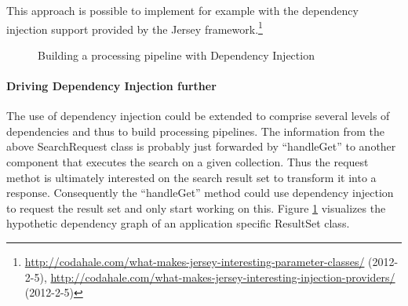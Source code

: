 \documentclass[12pt,a4paper,twoside]{scrartcl}		%
\newcommand{\citeurl}[2]{\url{#1} (#2)}
\begin{document}
This approach is possible to implement for example with the dependency injection
support provided by the Jersey
framework.\footnote{\citeurl{http://codahale.com/what-makes-jersey-interesting-parameter-classes/}{2012-2-5},
  \citeurl{http://codahale.com/what-makes-jersey-interesting-injection-providers/}{2012-2-5}}

\begin{figure}[tbph]
  \caption{Building a processing pipeline with Dependency Injection}
  \label{fig:dependency-injection-pipeline}
\end{figure}

\paragraph{Driving Dependency Injection further}

The use of dependency injection could be extended to comprise several levels of
dependencies and thus to build processing pipelines.  The information from the
above SearchRequest class is probably just forwarded by ``handleGet'' to another
component that executes the search on a given collection. Thus the request
methot is ultimately interested on the search result set to transform it into a
response. Consequently the ``handleGet'' method could use dependency injection
to request the result set and only start working on this. Figure
\ref{fig:dependency-injection-pipeline} visualizes the hypothetic dependency
graph of an application specific ResultSet class.
\end{document}
